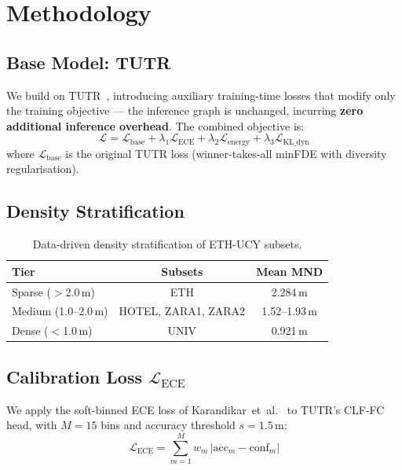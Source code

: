 \documentclass{article}
\makeatletter
\newcommand{\etal}{et~al.\@}
\makeatother
\begin{document}
\section{Methodology}
\label{sec:method}

\subsection{Base Model: TUTR}
\label{sec:method:tutr}

We build on TUTR~\cite{shi2023tutr}, introducing auxiliary training-time
losses that modify only the training objective --- the inference graph is
unchanged, incurring \textbf{zero additional inference overhead}. The
combined objective is:
%
\begin{equation}
  \mathcal{L} = \mathcal{L}_{\text{base}} +
                \lambda_1 \mathcal{L}_{\text{ECE}} +
                \lambda_2 \mathcal{L}_{\text{energy}} +
                \lambda_3 \mathcal{L}_{\text{KL\_dyn}}
  \label{eq:combined}
\end{equation}
%
where \(\mathcal{L}_{\text{base}}\) is the original TUTR loss (winner-takes-all
minFDE with diversity regularisation).

\subsection{Density Stratification}
\label{sec:method:density}

\begin{table}[h]
\centering
\small
\caption{Data-driven density stratification of ETH-UCY subsets.}
\label{tab:density}
\begin{tabular}{l c c}
\toprule
Tier & Subsets & Mean MND \\
\midrule
Sparse (\(>\)2.0\,m) & ETH & 2.284\,m \\
Medium (1.0--2.0\,m) & HOTEL, ZARA1, ZARA2 & 1.52--1.93\,m \\
Dense (\(<\)1.0\,m) & UNIV & 0.921\,m \\
\bottomrule
\end{tabular}
\end{table}

\subsection{Calibration Loss \(\mathcal{L}_{\text{ECE}}\)}
\label{sec:method:ece}

We apply the soft-binned ECE loss of Karandikar~\etal~\cite{karandikar2021soft}
to TUTR's CLF-FC head, with \(M=15\) bins and accuracy threshold
\(s=1.5\)\,m:
%
\begin{equation}
  \mathcal{L}_{\text{ECE}} = \sum_{m=1}^{M} w_m \,
  \bigl| \overline{\text{acc}}_m - \overline{\text{conf}}_m \bigr|
  \label{eq:lece}
\end{equation}
\end{document}
